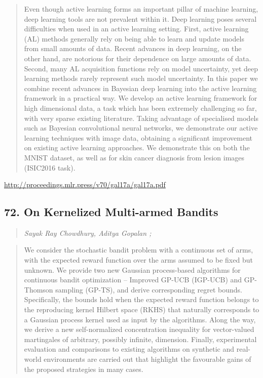 \documentclass{article}
\begin{document}
\begin{quote}
    Even though active learning forms an important pillar of machine learning, deep learning tools are not prevalent within it. Deep learning poses several difficulties when used in an active learning setting. First, active learning (AL) methods generally rely on being able to learn and update models from small amounts of data. Recent advances in deep learning, on the other hand, are notorious for their dependence on large amounts of data. Second, many AL acquisition functions rely on model uncertainty, yet deep learning methods rarely represent such model uncertainty. In this paper we combine recent advances in Bayesian deep learning into the active learning framework in a practical way. We develop an active learning framework for high dimensional data, a task which has been extremely challenging so far, with very sparse existing literature. Taking advantage of specialised models such as Bayesian convolutional neural networks, we demonstrate our active learning techniques with image data, obtaining a significant improvement on existing active learning approaches. We demonstrate this on both the MNIST dataset, as well as for skin cancer diagnosis from lesion images (ISIC2016 task).  
\end{quote}

\href{http://proceedings.mlr.press/v70/gal17a/gal17a.pdf}{http://proceedings.mlr.press/v70/gal17a/gal17a.pdf}

\subsection{72. On Kernelized Multi-armed Bandits}

\begin{quote}
\footnotesize{\textit{Sayak Ray Chowdhury, Aditya Gopalan ;}}

\end{quote}

\begin{quote}
    We consider the stochastic bandit problem with a continuous set of arms, with the expected reward function over the arms assumed to be fixed but unknown. We provide two new Gaussian process-based algorithms for continuous bandit optimization – Improved GP-UCB (IGP-UCB) and GP-Thomson sampling (GP-TS), and derive corresponding regret bounds. Specifically, the bounds hold when the expected reward function belongs to the reproducing kernel Hilbert space (RKHS) that naturally corresponds to a Gaussian process kernel used as input by the algorithms. Along the way, we derive a new self-normalized concentration inequality for vector-valued martingales of arbitrary, possibly infinite, dimension. Finally, experimental evaluation and comparisons to existing algorithms on synthetic and real-world environments are carried out that highlight the favourable gains of the proposed strategies in many cases.  
\end{quote}
\end{document}
